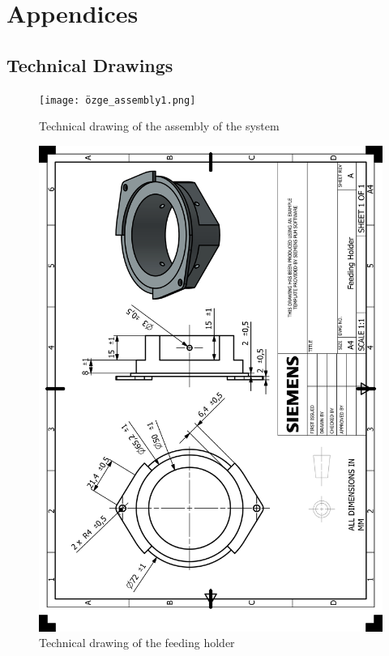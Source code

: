 \documentclass[12pt]{article}
\begin{document}
\newpage

\section{Appendices}

\begin{appendices}

\section{Technical Drawings}

\begin{figure}[H]
    \centering
    \texttt{[image: özge\_assembly1.png]} %
    \caption{Technical drawing of the assembly of the system}
    \label{fig:technical-drawing}
\end{figure}

\begin{figure}[H]
    \centering
    \includegraphics[width=\textwidth]{HP_Feeding Holder.png} 
    \caption{Technical drawing of the feeding holder}
    \label{fig:technical-drawing}
\end{figure}


\end{appendices}
\end{document}
